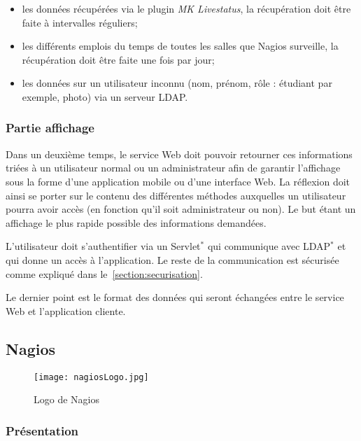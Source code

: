 \begin{itemize}
	\item les donn\'ees r\'ecup\'er\'ees via le plugin \textit{MK Livestatus}, la r\'ecup\'eration doit \^etre faite \`a intervalles r\'eguliers;
	\item les diff\'erents emplois du temps de toutes les salles que Nagios surveille, la r\'ecup\'eration doit \^etre faite une fois par jour;
	\item les donn\'ees sur un utilisateur inconnu (nom, pr\'enom, r\^ole : \'etudiant par exemple, photo) via un serveur LDAP.

\end{itemize}

\subsubsection{Partie affichage}

Dans un deuxi\`eme temps, le service Web doit pouvoir retourner ces informations tri\'ees \`a un utilisateur normal ou un administrateur afin de garantir l'affichage sous la forme d'une application mobile ou d'une interface Web.
La r\'eflexion doit ainsi se porter sur le contenu des diff\'erentes m\'ethodes auxquelles un utilisateur pourra avoir acc\`es (en fonction qu'il soit administrateur ou non).
Le but \'etant un affichage le plus rapide possible des informations demand\'ees.

L'utilisateur doit s'authentifier via un Servlet$^*$ qui communique avec LDAP$^*$ et qui donne un acc\`es \`a l'application.
Le reste de la communication est s\'ecuris\'ee comme expliqu\'e dans le~\ref{section:securisation}.

Le dernier point est le format des donn\'ees qui seront \'echang\'ees entre le service Web et l'application cliente.

\subsection{Nagios}
\label{section:nagios}

\begin{figure}[!ht]
	\centering
	\texttt{[image: nagiosLogo.jpg]}
	\caption{Logo de Nagios}

\end{figure}

\subsubsection{Pr\'esentation}

